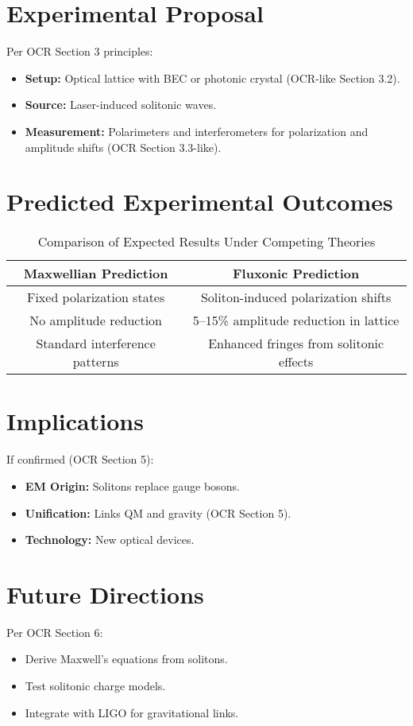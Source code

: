\documentclass{article}
\begin{document}
\section{Experimental Proposal}
Per OCR Section 3 principles:
\begin{itemize}
    \item \textbf{Setup:} Optical lattice with BEC or photonic crystal (OCR-like Section 3.2).
    \item \textbf{Source:} Laser-induced solitonic waves.
    \item \textbf{Measurement:} Polarimeters and interferometers for polarization and amplitude shifts (OCR Section 3.3-like).
\end{itemize}

\section{Predicted Experimental Outcomes}
\begin{table}[h]
    \centering
    \begin{tabular}{|c|c|}
        \hline
        \textbf{Maxwellian Prediction} & \textbf{Fluxonic Prediction} \\
        \hline
        Fixed polarization states & Soliton-induced polarization shifts \\
        No amplitude reduction & 5–15\% amplitude reduction in lattice \\
        Standard interference patterns & Enhanced fringes from solitonic effects \\
        \hline
    \end{tabular}
    \caption{Comparison of Expected Results Under Competing Theories}
    \label{tab:predictions}
\end{table}

\section{Implications}
If confirmed (OCR Section 5):
\begin{itemize}
    \item \textbf{EM Origin:} Solitons replace gauge bosons.
    \item \textbf{Unification:} Links QM and gravity (OCR Section 5).
    \item \textbf{Technology:} New optical devices.
\end{itemize}

\section{Future Directions}
Per OCR Section 6:
\begin{itemize}
    \item Derive Maxwell’s equations from solitons.
    \item Test solitonic charge models.
    \item Integrate with LIGO for gravitational links.
\end{itemize}
\end{document}
